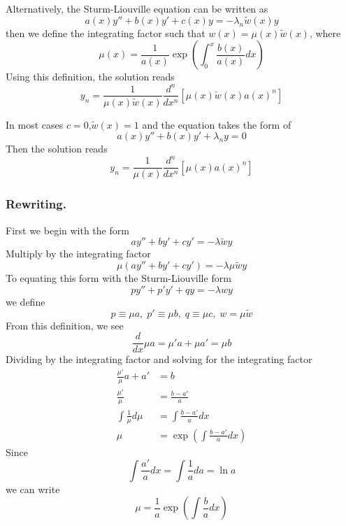 \documentclass[../../../main.tex]{subfiles}
\begin{document}
Alternatively, the Sturm-Liouville equation can be written as
\begin{equation*}
    a(x)y''+b(x)y'+c(x)y=-\lambda_n \tilde{w}(x)y
\end{equation*}
then we define the integrating factor such that $w(x)=\mu(x)\tilde{w}(x)$, where
\begin{equation*}
    \mu(x)=\frac{1}{a(x)}\exp\left(\int_0^x \frac{b(x)}{a(x)}dx\right)
\end{equation*}
Using this definition, the solution reads
\begin{equation*}
    y_n=\frac{1}{\mu(x)\tilde{w}(x)}\frac{d^n}{dx^n}[\mu(x)\tilde{w}(x)a(x)^n]
\end{equation*}

In most cases $c=0$,$\tilde{w}(x)=1$ and the equation takes the form of
\begin{equation*}
    a(x)y''+b(x)y'+\lambda_ny=0
\end{equation*}
Then the solution reads
\begin{equation*}
    y_n=\frac{1}{\mu(x)}\frac{d^n}{dx^n}[\mu(x)a(x)^n]
\end{equation*}

\subsubsection{Rewriting.} First we begin with the form
\begin{equation*}
    ay''+by'+cy'=-\lambda \tilde{w}y
\end{equation*}
Multiply by the integrating factor
\begin{equation*}
    \mu(ay''+by'+cy')=-\lambda \mu \tilde{w}y
\end{equation*}
To equating this form with the Sturm-Liouville form
\begin{equation*}
    py''+p'y'+qy=-\lambda w y
\end{equation*}
we define
\begin{equation*}
    p\equiv\mu a,\;p'\equiv \mu b,\;q\equiv\mu c,\;w=\mu\tilde{w}
\end{equation*}
From this definition, we see
\begin{equation*}
    \frac{d}{dx}\mu a=\mu' a+\mu a'=\mu b
\end{equation*}
Dividing by the integrating factor and solving for the integrating factor
\begin{align*}
    \frac{\mu'}{\mu}a+a'  & =b                                     \\
    \frac{\mu'}{\mu}      & =\frac{b-a'}{a}                        \\
    \int\frac{1}{\mu}d\mu & =\int\frac{b-a'}{a}dx                  \\
    \mu                   & =\exp\left(\int\frac{b-a'}{a}dx\right)
\end{align*}
Since
\begin{equation*}
    \int\frac{a'}{a}dx=\int\frac{1}{a}da=\ln a
\end{equation*}
we can write
\begin{equation*}
    \mu=\frac{1}{a}\exp\left(\int\frac{b}{a}dx\right)
\end{equation*}
\end{document}
